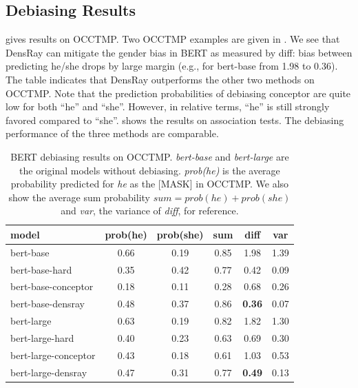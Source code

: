 
\subsection{Debiasing Results}
 gives results on OCCTMP. Two OCCTMP
examples are given in . We see that
DensRay can mitigate the gender bias in BERT as measured by
diff: bias between predicting he/she drops by large margin
(e.g., for bert-base from 1.98 to 0.36). The table indicates
that DensRay outperforms the other two methods on OCCTMP.
Note that
the prediction probabilities of debiasing conceptor are
quite low for both ``he'' and ``she''. However,
in relative terms, ``he'' is still strongly favored compared
to ``she''.
 shows the results on association tests. The debiasing performance of the three methods are comparable.

\begin{table}[ht]
\centering
\footnotesize
\begin{tabular}{lccccc}
\hline
model & prob(he) & prob(she) & sum &diff & var\\
\hline
bert-base & 0.66 & 0.19 & 0.85 &1.98&1.39\\
bert-base-hard & 0.35 & 0.42 & 0.77&0.42&0.09\\
bert-base-conceptor & 0.18 & 0.11 & 0.28 & 0.68&0.26\\
bert-base-densray & 0.48 & 0.37 & 0.86&\textbf{0.36}&0.07\\
\hline
bert-large  & 0.63 & 0.19 & 0.82  &1.82&1.30\\
bert-large-hard & 0.40 & 0.23 & 0.63&0.69&0.30\\
bert-large-conceptor & 0.43 & 0.18 & 0.61 & 1.03&0.53\\
bert-large-densray  & 0.47 & 0.31 & 0.77&\textbf{0.49}&0.13 \\
\hline
\end{tabular}
\caption{ BERT debiasing results on OCCTMP. \textit{bert-base} and \textit{bert-large} are the original models without debiasing. \textit{prob(he)} is
	the average probability predicted for \textit{he} as the [MASK] in OCCTMP. We also show the average sum probability $sum=prob(he)+prob(she)$ and \textit{var}, the variance of \textit{ diff}, for reference.}
\end{table}

